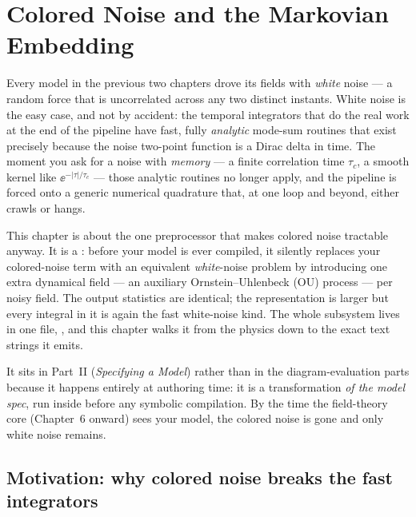 \chapter{Colored Noise and the Markovian Embedding}\label{ch:colored-markovian}

Every model in the previous two chapters drove its fields with \emph{white}
noise --- a random force that is uncorrelated across any two distinct instants.
White noise is the easy case, and not by accident: the temporal integrators that
do the real work at the end of the pipeline have fast, fully \emph{analytic}
mode-sum routines that exist precisely because the noise two-point function is a
Dirac delta in time. The moment you ask for a noise with \emph{memory} --- a
finite correlation time $\tau_c$, a smooth kernel like $\ee^{-|\tau|/\tau_c}$ ---
those analytic routines no longer apply, and the pipeline is forced onto a
generic numerical quadrature that, at one loop and beyond, either crawls or
hangs.

This chapter is about the one preprocessor that makes colored noise tractable
anyway. It is a : before your model is ever compiled,
it silently replaces your colored-noise term with an equivalent \emph{white}-noise
problem by introducing one extra dynamical field --- an auxiliary
Ornstein--Uhlenbeck (OU) process --- per noisy field. The output statistics are
identical; the representation is larger but every integral in it is again the
fast white-noise kind. The whole subsystem lives in one file,
, and this chapter walks it from the
physics down to the exact text strings it emits.

It sits in Part~II (\emph{Specifying a Model}) rather than in the
diagram-evaluation parts because it happens entirely at authoring time: it is a
transformation \emph{of the model spec}, run inside 
before any symbolic compilation. By the time the field-theory core (Chapter~6
onward) sees your model, the colored noise is gone and only white noise remains.

\section{Motivation: why colored noise breaks the fast integrators}


